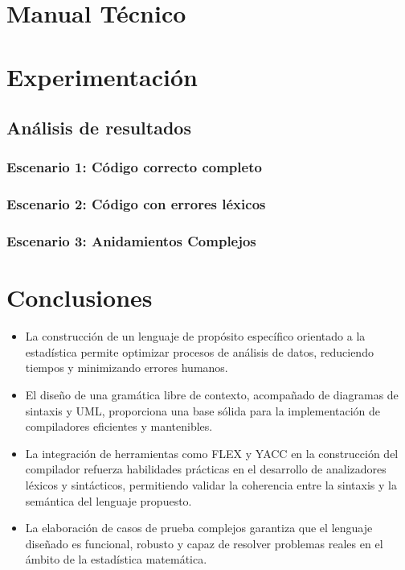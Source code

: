 \documentclass{article}
\begin{document}

\section{Manual Técnico}\label{sec:man_t}


\section{Experimentación}\label{sec:exp}

\subsection{Análisis de resultados}

\subsubsection{Escenario 1: Código correcto completo}



\subsubsection{Escenario 2: Código con errores léxicos}


\subsubsection{Escenario 3:  Anidamientos Complejos }



\section{Conclusiones}

\begin{itemize}
    \item La construcción de un lenguaje de propósito específico orientado a la estadística permite optimizar procesos de análisis de datos, reduciendo tiempos y minimizando errores humanos.
    
    \item El diseño de una gramática libre de contexto, acompañado de diagramas de sintaxis y UML, proporciona una base sólida para la implementación de compiladores eficientes y mantenibles.
    
    \item La integración de herramientas como FLEX y YACC en la construcción del compilador refuerza habilidades prácticas en el desarrollo de analizadores léxicos y sintácticos, permitiendo validar la coherencia entre la sintaxis y la semántica del lenguaje propuesto.
    
    \item La elaboración de casos de prueba complejos garantiza que el lenguaje diseñado es funcional, robusto y capaz de resolver problemas reales en el ámbito de la estadística matemática.
\end{itemize}
\end{document}
